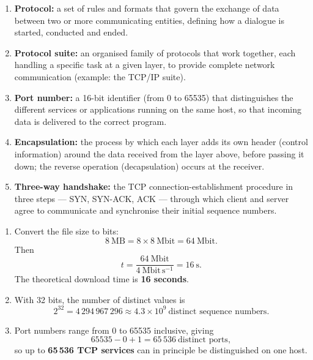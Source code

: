 \documentclass[11pt]{article}
\begin{document}
\begin{corrige}
\begin{enumerate}
\item \textbf{Protocol:} a set of rules and formats that govern the exchange of data between two or more communicating entities, defining how a dialogue is started, conducted and ended.
\item \textbf{Protocol suite:} an organised family of protocols that work together, each handling a specific task at a given layer, to provide complete network communication (example: the TCP/IP suite).
\item \textbf{Port number:} a 16-bit identifier (from 0 to 65535) that distinguishes the different services or applications running on the same host, so that incoming data is delivered to the correct program.
\item \textbf{Encapsulation:} the process by which each layer adds its own header (control information) around the data received from the layer above, before passing it down; the reverse operation (decapsulation) occurs at the receiver.
\item \textbf{Three-way handshake:} the TCP connection-establishment procedure in three steps — SYN, SYN-ACK, ACK — through which client and server agree to communicate and synchronise their initial sequence numbers.
\end{enumerate}
\end{corrige}

\begin{corrige}
\begin{enumerate}
\item Convert the file size to bits:
\[ 8\ \mathrm{MB} = 8 \times 8\ \mathrm{Mbit} = 64\ \mathrm{Mbit}. \]
Then
\[ t = \dfrac{64\ \mathrm{Mbit}}{4\ \mathrm{Mbit\,s^{-1}}} = 16\ \mathrm{s}. \]
The theoretical download time is \textbf{16 seconds}.
\item With 32 bits, the number of distinct values is
\[ 2^{32} = 4\,294\,967\,296 \approx 4.3 \times 10^{9}\ \text{distinct sequence numbers}. \]
\item Port numbers range from 0 to 65535 inclusive, giving
\[ 65535 - 0 + 1 = 65\,536\ \text{distinct ports}, \]
so up to \textbf{65\,536 TCP services} can in principle be distinguished on one host.
\end{enumerate}
\end{corrige}
\end{document}
